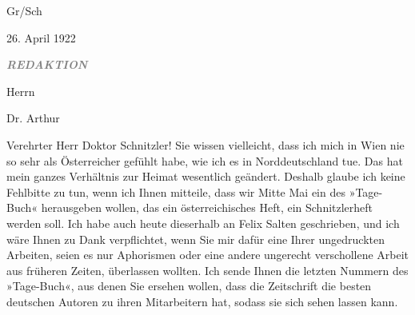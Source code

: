 \pstart
           Gr/Sch\pend
           
\pstart
           \centering{}26. April 1922\pend
           
\pstart
           \textcolor{gray}{\textbf{\emph{REDAKTION}}}\pend
           
\pstart
           Herrn\pend
           
\pstart
           Dr. Arthur \pend
           
\pstart
           \pend
           
\pstart\center{}Verehrter Herr \introOben{}Doktor\introOben{}
                  Schnitzler!\pend\vspace{0.5em}
\pstart
           Sie wissen vielleicht, dass ich mich in Wien nie
               so sehr als Österreicher gefühlt habe, wie ich
               es in Norddeutschland tue. Das hat mein ganzes
               Verhältnis zur Heimat wesentlich geändert. Deshalb glaube ich keine Fehlbitte zu tun,
               wenn ich Ihnen mitteile, dass wir Mitte Mai ein \label{K_L02378-1v}\label{K_L02378-1} des
                  »Tage-Buch« herausgeben wollen, das ein österreichisches Heft, ein Schnitzlerheft werden
               soll. Ich habe auch heute dieserhalb an Felix
                  Salten geschrieben, und ich wäre Ihnen zu Dank verpflichtet, wenn Sie mir
               dafür eine Ihrer ungedruckten Arbeiten, seien es nur Aphorismen oder eine andere
               ungerecht verschollene Arbeit aus früheren Zeiten, überlassen wollten. Ich sende
               Ihnen die letzten Nummern des »Tage-Buch«, aus
               denen Sie ersehen wollen, dass die Zeitschrift die besten deutschen Autoren zu ihren
               Mitarbeitern hat, sodass sie sich sehen lassen kann.\pend
           
